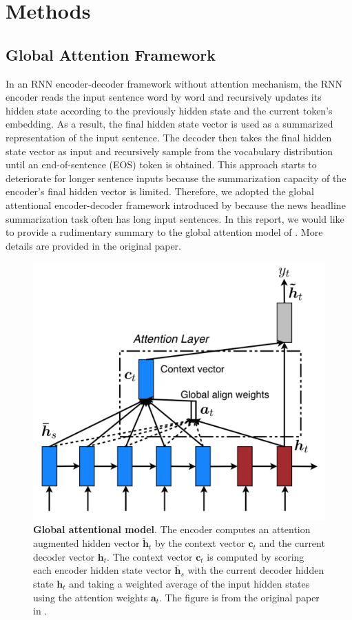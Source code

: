 \section{Methods}
\label{sec: method}

\subsection{Global Attention Framework}
In an RNN encoder-decoder framework without attention mechanism, the RNN encoder reads the input sentence word by word and recursively updates its hidden state according to the previously hidden state and the current token's embedding.
As a result, the final hidden state vector is used as a summarized representation of the input sentence.
The decoder then takes the final hidden state vector as input and recursively sample from the vocabulary distribution until an end-of-sentence (EOS) token is obtained. This approach starts to deteriorate for longer sentence inputs because the summarization capacity of the encoder's final hidden vector is limited. 
Therefore, we adopted the global attentional encoder-decoder framework introduced by \cite{luong2015effective} because the news headline summarization task often has long input sentences. In this report, we would like to provide a rudimentary summary to the global attention model of \cite{luong2015effective}. More details are provided in the original paper. 

\begin{figure}
\centering
\includegraphics[width=\linewidth]{figures/luong2015.png}
\vspace{-8mm}
\caption{\textbf{Global attentional model}. The encoder computes an attention augmented hidden vector $\bm{\tilde h}_t$ by the context vector $\bm{c}_t$ and the current decoder vector $\bm{h}_t$. The context vector $\bm{c}_t$ is computed by
scoring each encoder hidden state vector $\bm{\bar h}_s$ with the current decoder hidden state $\bm{h}_t$ and taking a weighted average of the input hidden states using the attention weights $\bm{a}_t$. The figure is from the original paper in \cite{luong2015effective}.}
\label{fig: luong2015}
\end{figure}


